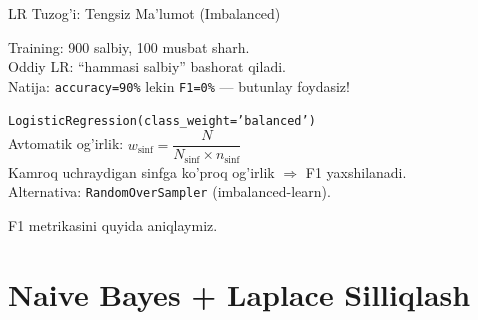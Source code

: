 \documentclass[aspectratio=169,11pt]{beamer}
\begin{document}
\begin{frame}{LR Tuzog'i: Tengsiz Ma'lumot (Imbalanced)}
  \begin{tcolorbox}[warnbox,title=Muammo]
    \small
    Training: 900 salbiy, 100 musbat sharh.\\
    Oddiy LR: ``hammasi salbiy'' bashorat qiladi.\\
    Natija: \texttt{accuracy=90\%} lekin \texttt{F1=0\%}
    --- butunlay foydasiz!
  \end{tcolorbox}
  \vspace{6pt}
  \begin{tcolorbox}[okbox,title=Yechim: \texttt{class\_weight=`balanced'}]
    \small
    \texttt{LogisticRegression(class\_weight='balanced')}\\[5pt]
    Avtomatik og'irlik:\quad
    $w_{\text{sinf}} = \dfrac{N}{N_{\text{sinf}}\times n_{\text{sinf}}}$\\[4pt]
    \textcolor{halfgray}{\footnotesize
      Kamroq uchraydigan sinfga ko'proq og'irlik $\Rightarrow$
      F1 yaxshilanadi.\\
      Alternativa: \texttt{RandomOverSampler} (imbalanced-learn).}
  \end{tcolorbox}
  \vspace{4pt}
  \small\textcolor{halfgray}{F1 metrikasini quyida aniqlaymiz.}
\end{frame}

\section[Naive Bayes]{Naive Bayes + Laplace Silliqlash}
\end{document}
